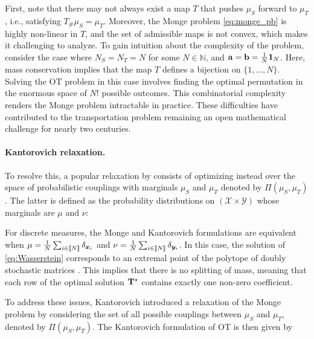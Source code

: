 First, note that there may not always exist a map \(T\) that pushes \(\mu_S\) forward to \(\mu_T\), i.e., satisfying \(T_{\#}\mu_S = \mu_T\). Moreover, the Monge problem \eqref{eq:monge_pb} is highly non-linear in \(T\), and the set of admissible maps is not convex, which makes it challenging to analyze. To gain intuition about the complexity of the problem, consider the case where \(N_S = N_T = N\) for some \(N \in \mathbb{N}\), and \({\mathbf{a}} = {\mathbf{b}} = \frac{1}{N} \mathbf{1}_N\). Here, mass conservation implies that the map \(T\) defines a bijection on \(\{1, \ldots, N\}\). Solving the OT problem in this case involves finding the optimal permutation in the enormous space of \(N!\) possible outcomes. This combinatorial complexity renders the Monge problem intractable in practice. These difficulties have contributed to the transportation problem remaining an open mathematical challenge for nearly two centuries.


\paragraph{Kantorovich relaxation.}

To resolve this, a popular relaxation by \citep{kantorovich1942translocation} consists of optimizing instead over the space of probabilistic couplings with marginals $\mu_S$ and $\mu_T$ denoted by $\Pi(\mu_S, \mu_T)$. 
    The latter is defined as the probability distributions on $(\mathcal{X} \times \mathcal{Y})$ whose marginals are $\mu$ and $\nu$:


For discrete measures, the Monge and Kantorovich formulations are equivalent when $\mu = \frac{1}{N} \sum_{i \in {[\![N]\!]}} \delta_{\bm{x}_i}$ and $\nu = \frac{1}{N} \sum_{i \in {[\![N]\!]}} \delta_{\bm{y}_i}$. In this case, the solution of \eqref{eq:Wasserstein} corresponds to an extremal point of the polytope of doubly stochastic matrices \citep{bertsimas1997introduction}. This implies that there is no splitting of mass, meaning that each row of the optimal solution ${\mathbf{T}}^\star$ contains exactly one non-zero coefficient.

To address these issues, Kantorovich introduced a relaxation of the Monge problem by considering the set of all possible couplings between \(\mu_S\) and \(\mu_T\), denoted by \(\Pi(\mu_S, \mu_T)\). The Kantorovich formulation of OT is then given by

